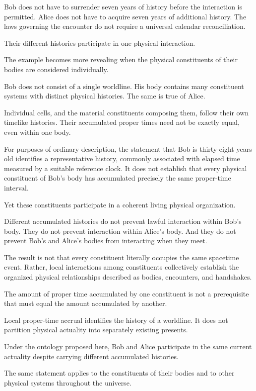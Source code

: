 \documentclass[12pt,onecolumn]{article}
\begin{document}
Bob does not have to surrender seven years of history before the interaction is permitted. Alice does not have to acquire seven years of additional history. The laws governing the encounter do not require a universal calendar reconciliation.

Their different histories participate in one physical interaction.

The example becomes more revealing when the physical constituents of their bodies are considered individually.

Bob does not consist of a single worldline. His body contains many constituent systems with distinct physical histories. The same is true of Alice.

Individual cells, and the material constituents composing them, follow their own timelike histories. Their accumulated proper times need not be exactly equal, even within one body.

For purposes of ordinary description, the statement that Bob is thirty-eight years old identifies a representative history, commonly associated with elapsed time measured by a suitable reference clock. It does not establish that every physical constituent of Bob's body has accumulated precisely the same proper-time interval.

Yet these constituents participate in a coherent living physical organization.

Different accumulated histories do not prevent lawful interaction within Bob's body. They do not prevent interaction within Alice's body. And they do not prevent Bob's and Alice's bodies from interacting when they meet.

The result is not that every constituent literally occupies the same spacetime event. Rather, local interactions among constituents collectively establish the organized physical relationships described as bodies, encounters, and handshakes.

The amount of proper time accumulated by one constituent is not a prerequisite that must equal the amount accumulated by another.

Local proper-time accrual identifies the history of a worldline. It does not partition physical actuality into separately existing presents.

Under the ontology proposed here, Bob and Alice participate in the same current actuality despite carrying different accumulated histories.

The same statement applies to the constituents of their bodies and to other physical systems throughout the universe.
\end{document}

